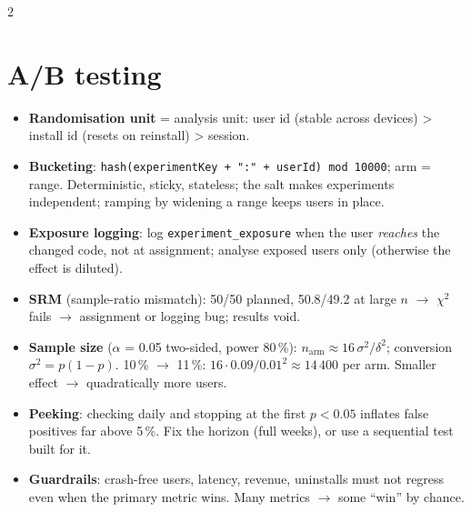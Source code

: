\documentclass[8pt]{extarticle}
\newcommand\ct[1]{\texttt{#1}}
\begin{document}
\begin{multicols}{2}
\section{A/B testing}
\begin{itemize}
  \item \textbf{Randomisation unit} = analysis unit: user id (stable across
        devices) > install id (resets on reinstall) > session.
  \item \textbf{Bucketing}: \ct{hash(experimentKey + ":" + userId) mod 10000};
        arm = range. Deterministic, sticky, stateless; the salt makes
        experiments independent; ramping by widening a range keeps users in place.
  \item \textbf{Exposure logging}: log \ct{experiment\_exposure} when the user
        \emph{reaches} the changed code, not at assignment; analyse exposed users
        only (otherwise the effect is diluted).
  \item \textbf{SRM} (sample-ratio mismatch): 50/50 planned, 50.8/49.2 at large
        $n$ $\to$ $\chi^2$ fails $\to$ assignment or logging bug; results void.
  \item \textbf{Sample size} ($\alpha$ = 0.05 two-sided, power 80\,\%):
        $n_{\mathrm{arm}} \approx 16\,\sigma^2/\delta^2$; conversion
        $\sigma^2 = p(1-p)$. 10\,\% $\to$ 11\,\%: $16 \cdot 0.09/0.01^2 \approx
        14\,400$ per arm. Smaller effect $\to$ quadratically more users.
  \item \textbf{Peeking}: checking daily and stopping at the first $p<0.05$
        inflates false positives far above 5\,\%. Fix the horizon (full weeks),
        or use a sequential test built for it.
  \item \textbf{Guardrails}: crash-free users, latency, revenue, uninstalls
        must not regress even when the primary metric wins. Many metrics
        $\to$ some ``win'' by chance.
\end{itemize}


\end{multicols}
\end{document}
